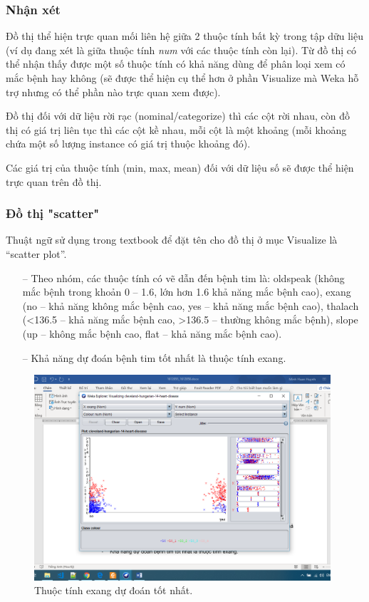\subsubsection{Nhận xét}
Đồ thị thể hiện trực quan mối liên hệ giữa 2 thuộc tính bất kỳ trong tập dữu liệu (ví dụ đang xét là giữa thuộc tính \textit{num} với các thuộc tính còn lại). Từ đồ thị có thể nhận thấy được một số thuộc tính có khả năng dùng để phân loại xem có mắc bệnh hay không (sẽ được thể hiện cụ thể hơn ở phần Visualize mà Weka hỗ trợ nhưng có thể phần nào trực quan xem được).

Đồ thị đối với dữ liệu rời rạc (nominal/categorize) thì các cột rời nhau, còn đồ thị có giá trị liên tục thì các cột kề nhau, mỗi cột là một khoảng (mỗi khoảng chứa một số lượng instance có giá trị thuộc khoảng đó).

Các giá trị của thuộc tính (min, max, mean) đối với dữ liệu số sẽ được thể hiện trực quan trên đồ thị.

\subsubsection{Đồ thị "scatter"}
Thuật ngữ sử dụng trong textbook để đặt tên cho đồ thị ở mục Visualize là “scatter plot”. 
\begin{itemize}
	\item[--]Theo nhóm, các thuộc tính có vẽ dẫn đến bệnh tim là: oldspeak (không mắc bệnh trong khoản 0 – 1.6, lớn hơn 1.6 khả năng mắc bệnh cao), exang (no – khả năng không mắc bệnh cao, yes – khả năng mắc bệnh cao), thalach (<136.5 – khả năng mắc bệnh cao, >136.5 – thường không mắc bệnh), slope (up – không mắc bệnh cao, flat – khả năng mắc bệnh cao).
	\item[--]Khả năng dự đoán bệnh tim tốt nhất là thuộc tính exang.
\end{itemize}
\begin{figure}[H]
\centering
\includegraphics[width=0.98\textwidth]{2/17.png}
\caption{Thuộc tính exang dự đoán tốt nhất.}
\end{figure}

